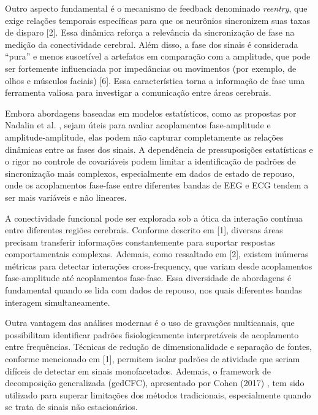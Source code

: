 Outro aspecto fundamental é o mecanismo de feedback denominado \emph{reentry}, que exige relações temporais específicas para que os neurônios sincronizem suas taxas de disparo [2]. Essa dinâmica reforça a relevância da sincronização de fase na medição da conectividade cerebral. Além disso, a fase dos sinais é considerada “pura” e menos suscetível a artefatos em comparação com a amplitude, que pode ser fortemente influenciada por impedâncias ou movimentos (por exemplo, de olhos e músculos faciais) [6]. Essa característica torna a informação de fase uma ferramenta valiosa para investigar a comunicação entre áreas cerebrais.

Embora abordagens baseadas em modelos estatísticos, como as propostas por Nadalin et al. \cite{nadalin2019statistical}, sejam úteis para avaliar acoplamentos fase-amplitude e amplitude-amplitude, elas podem não capturar completamente as relações dinâmicas entre as fases dos sinais. A dependência de pressuposições estatísticas e o rigor no controle de covariáveis podem limitar a identificação de padrões de sincronização mais complexos, especialmente em dados de estado de repouso, onde os acoplamentos fase-fase entre diferentes bandas de EEG e ECG tendem a ser mais variáveis e não lineares.

A conectividade funcional pode ser explorada sob a ótica da interação contínua entre diferentes regiões cerebrais. Conforme descrito em [1], diversas áreas precisam transferir informações constantemente para suportar respostas comportamentais complexas. Ademais, como ressaltado em [2], existem inúmeras métricas para detectar interações cross-frequency, que variam desde acoplamentos fase-amplitude até acoplamentos fase-fase. Essa diversidade de abordagens é fundamental quando se lida com dados de repouso, nos quais diferentes bandas interagem simultaneamente.

Outra vantagem das análises modernas é o uso de gravações multicanais, que possibilitam identificar padrões fisiologicamente interpretáveis de acoplamento entre frequências. Técnicas de redução de dimensionalidade e separação de fontes, conforme mencionado em [1], permitem isolar padrões de atividade que seriam difíceis de detectar em sinais monofacetados. Ademais, o framework de decomposição generalizada (gedCFC), apresentado por Cohen (2017) \cite{cohen2017multivariate}, tem sido utilizado para superar limitações dos métodos tradicionais, especialmente quando se trata de sinais não estacionários.

